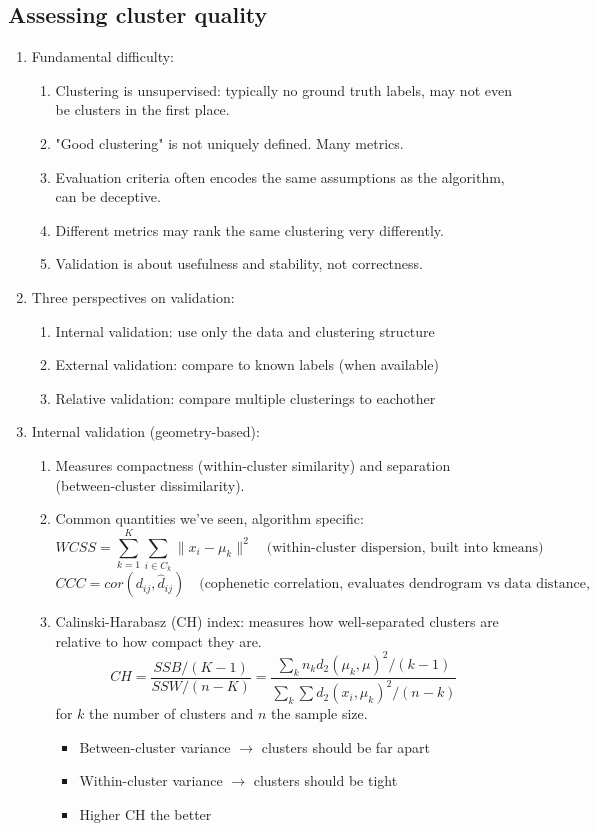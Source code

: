 \documentclass{article}
\begin{document}
\subsection*{Assessing cluster quality}

\begin{enumerate}
\item Fundamental difficulty:
\begin{enumerate}
\item Clustering is unsupervised: typically no ground truth labels, may not even be clusters in the first place.
\item "Good clustering" is not uniquely defined. Many metrics.
\item Evaluation criteria often encodes the same assumptions as the algorithm, can be deceptive.
\item Different metrics may rank the same clustering very differently.
\item Validation is about usefulness and stability, not correctness.
\end{enumerate}

\item Three perspectives on validation:
\begin{enumerate}
\item Internal validation: use only the data and clustering structure
\item External validation: compare to known labels (when available)
\item Relative validation: compare multiple clusterings to eachother
\end{enumerate}

\item Internal validation (geometry-based):
\begin{enumerate}
\item Measures compactness (within-cluster similarity) and separation (between-cluster dissimilarity).

\item Common quantities we've seen, algorithm specific:
\[
WCSS = \sum_{k=1}^K \sum_{i \in C_k} \|x_i - \mu_k \|^2 \quad \text{(within-cluster dispersion, built into kmeans)}
\]
\[
CCC = cor(d_{ij}, \hat{d}_{ij}) \quad \text{(cophenetic correlation, evaluates dendrogram vs data distance, hierarchial)}
\]

\item Calinski-Harabasz (CH) index: measures how well-separated clusters are relative to how compact they are.
\[
CH = \frac{SSB / (K-1)}{SSW / (n-K)} = \frac{\sum_k n_k d_2(\mu_k, \mu)^2 / (k-1)}{\sum_k \sum d_2(x_i, \mu_k)^2 / (n-k)}
\]
for $k$ the number of clusters and $n$ the sample size.
\begin{itemize}
\item Between-cluster variance $\rightarrow$ clusters should be far apart
\item Within-cluster variance $\rightarrow$ clusters should be tight
\item Higher CH the better
\end{itemize}


\end{enumerate}
\end{enumerate}
\end{document}
